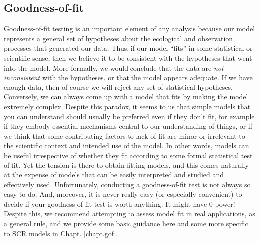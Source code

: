 \subsection{Goodness-of-fit}
\label{glms.sec.gof}

Goodness-of-fit testing is an important element of any analysis
because  our model represents a general set of hypotheses
about the ecological and observation processes that generated our
data. Thus, if our model ``fits'' in some statistical or scientific
sense, then we believe it to be consistent with the hypotheses that
went into the model. More formally, we would conclude that the data
are {\it not inconsistent} with the hypotheses, or that the model
appears adequate. If we have enough
data, then of course we will reject any set of statistical hypotheses.
Conversely, we can always come up with a model that fits by making the
model extremely complex. Despite this paradox, it seems to us that
simple models that you can understand should usually be preferred even
if they don't fit, for example if they embody essential mechanisms
central to our understanding of things, or
if we think that some contributing factors to lack-of-fit are minor or
irrelevant to the scientific context and intended use of the model.
In other words, models can be useful irrespective of whether they fit
according to some formal statistical test of fit.  Yet
the tension is there to obtain fitting models, and this comes naturally at
the expense of models that can be easily interpreted and studied and
effectively used.
Unfortunately, conducting a goodness-of-fit test is
not always so easy to do. And, moreover, it is never really easy (or
especially convenient) to decide if your goodness-of-fit test is worth
anything. It might have 0 power!
Despite this,
we recommend attempting to assess model fit in real applications,
as a general rule, and we provide some basic guidance here and some more
specific to SCR models in
Chapt. \ref{chapt.gof}.


